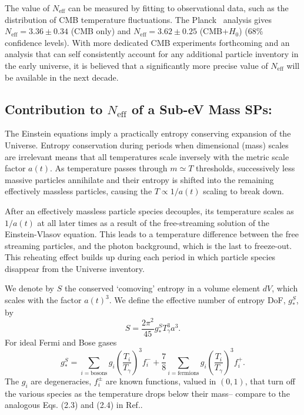 The value of $N_{\text{eff}}$ can be  measured by fitting to observational data, such as the distribution of CMB temperature fluctuations. The  Planck~\cite{Planck}  analysis gives $N_{\text{eff}}=3.36\pm 0.34$ (CMB only) and $N_{\text{eff}}=3.62\pm 0.25$ (CMB+$H_0$) ($68\%$ confidence levels). With more dedicated CMB experiments forthcoming and an analysis that can self consistently account for any additional particle inventory in the early universe, it is believed that a significantly more precise value of $N_{\text{eff}}$  will be available in the next decade. \\[-0.2cm]


\subsection{Contribution to $N_{\text{eff}}$ of a Sub-eV  Mass SPs:}  The Einstein equations  imply a practically entropy conserving expansion of the Universe. Entropy conservation during periods when dimensional (mass) scales are irrelevant means that all temperatures scale inversely with the metric  scale factor $a(t)$. As temperature  passes through $m\simeq T$ thresholds, successively less massive particles annihilate and their entropy is shifted into the remaining effectively massless particles, causing the  $T\propto 1/a(t)$ scaling to break down. 


After an effectively massless particle species decouples, its temperature scales as $1/a(t)$ at all later times as a result of the free-streaming solution of the Einstein-Vlasov equation.  This leads to a temperature difference between the free streaming particles, and the photon background, which is the last to freeze-out. This reheating effect builds up during each  period  in which particle species disappear from the Universe inventory.

We denote by $S$ the conserved `comoving' entropy in a volume element $dV$, which scales with the factor $a(t)^3$. We define the effective number of entropy DoF, $g_*^S$, by
\begin{equation}
S=\frac{2\pi^2}{45}g^S_*T_\gamma^3 a^3.
\end{equation} 
For ideal Fermi and Bose gases
\begin{equation}
g_*^S=\!\!\!\!\sum_{i=\text{bosons}}\!\!\!\!g_i \left(\frac{T_i}{T_\gamma}\right)^3\!\!\!f_i^-+\frac{7}{8}\!\!\!\sum_{i=\text{fermions}}\!\!\!\! g_i \left(\frac{T_i}{T_\gamma}\right)^3\!\!\!f_i^+.
\end{equation}
The $g_i$ are degeneracies, $f_i^\pm$ are known functions, valued in $(0,1)$, that turn off the various species as the temperature drops below their mass-- compare to the analogous Eqs. (2.3) and (2.4) in Ref.\cite{Blennow:2012de}. 


